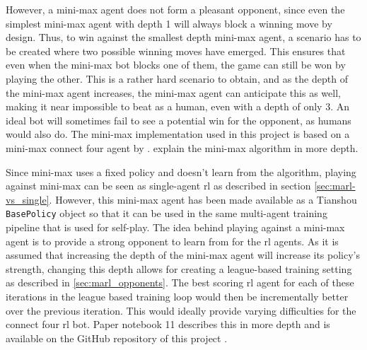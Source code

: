 However, a mini-max agent does not form a pleasant opponent, since even the simplest mini-max agent with depth 1 will always block a winning move by design.
Thus, to win against the smallest depth mini-max agent, a scenario has to be created where two possible winning moves have emerged.
This ensures that even when the mini-max bot blocks one of them, the game can still be won by playing the other.
This is a rather hard scenario to obtain, and as the depth of the mini-max agent increases, the mini-max agent can anticipate this as well, making it near impossible to beat as a human, even with a depth of only 3.
An ideal bot will sometimes fail to see a potential win for the opponent, as humans would also do.
The mini-max implementation used in this project is based on a mini-max connect four agent by \citet{minimax_base}.
 explain the mini-max algorithm in more depth.


Since mini-max uses a fixed policy and doesn't learn from the algorithm, playing against mini-max can be seen as single-agent \gls{rl} as described in section \ref{sec:marl-vs_single}.
However, this mini-max agent has been made available as a Tianshou \texttt{BasePolicy} object so that it can be used in the same multi-agent training pipeline that is used for self-play.
The idea behind playing against a mini-max agent is to provide a strong opponent to learn from for the \gls{rl} agents.
As it is assumed that increasing the depth of the mini-max agent will increase its policy's strength, changing this depth allows for creating a league-based training setting as described in \ref{sec:marl_opponents}.
The best scoring \gls{rl} agent for each of these iterations in the league based training loop would then be incrementally better over the previous iteration.
This would ideally provide varying difficulties for the connect four \gls{rl} bot.
Paper notebook 11 describes this in more depth and is available on the GitHub repository of this project \citep{github_project}.